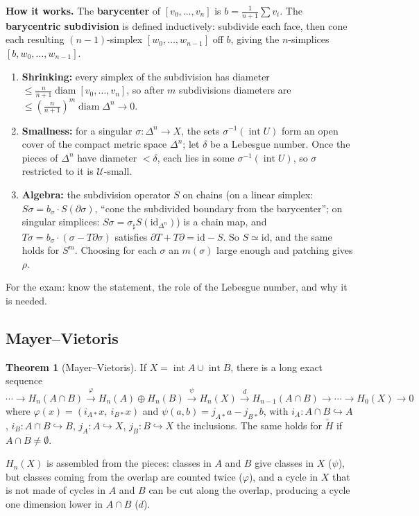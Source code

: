\documentclass[11pt]{article}
\newcommand{\Hred}{\tilde H}
\newcommand{\fig}[2]{\begin{center}\resizebox{#2}{!}{}\end{center}}
\theoremstyle{definition}
\newtheorem{thm}{Theorem}[section]
\begin{document}
\textbf{How it works.} The \textbf{barycenter} of $[v_0,\dots,v_n]$ is $b=\frac1{n+1}\sum v_i$. The \textbf{barycentric subdivision} is defined inductively: subdivide each face, then cone each resulting $(n-1)$-simplex $[w_0,\dots,w_{n-1}]$ off $b$, giving the $n$-simplices $[b,w_0,\dots,w_{n-1}]$.
\fig{barycentric}{0.28\textwidth}
\begin{enumerate}
\item \textbf{Shrinking:} every simplex of the subdivision has diameter $\le\frac{n}{n+1}\operatorname{diam}[v_0,\dots,v_n]$, so after $m$ subdivisions diameters are $\le(\frac n{n+1})^m\operatorname{diam}\Delta^n\to0$.
\item \textbf{Smallness:} for a singular $\sigma:\Delta^n\to X$, the sets $\sigma^{-1}(\operatorname{int}U)$ form an open cover of the compact metric space $\Delta^n$; let $\delta$ be a Lebesgue number. Once the pieces of $\Delta^n$ have diameter $<\delta$, each lies in some $\sigma^{-1}(\operatorname{int}U)$, so $\sigma$ restricted to it is $\mathcal U$-small.
\item \textbf{Algebra:} the subdivision operator $S$ on chains (on a linear simplex: $S\sigma=b_\sigma\cdot S(\partial\sigma)$, ``cone the subdivided boundary from the barycenter''; on singular simplices: $S\sigma=\sigma_\sharp S(\mathrm{id}_{\Delta^n})$) is a chain map, and $T\sigma=b_\sigma\cdot(\sigma-T\partial\sigma)$ satisfies $\partial T+T\partial=\mathrm{id}-S$. So $S\simeq\mathrm{id}$, and the same holds for $S^m$. Choosing for each $\sigma$ an $m(\sigma)$ large enough and patching gives $\rho$.
\end{enumerate}
For the exam: know the statement, the role of the Lebesgue number, and why it is needed.

\subsection{Mayer--Vietoris}
\begin{thm}[Mayer--Vietoris]
If $X=\operatorname{int}A\cup\operatorname{int}B$, there is a long exact sequence
\[\cdots\to H_n(A\cap B)\xrightarrow{\varphi}H_n(A)\oplus H_n(B)\xrightarrow{\psi}H_n(X)\xrightarrow{d}H_{n-1}(A\cap B)\to\cdots\to H_0(X)\to0\]
where $\varphi(x)=(i_{A*}x,\ i_{B*}x)$ and $\psi(a,b)=j_{A*}a-j_{B*}b$, with $i_A:A\cap B\hookrightarrow A$, $i_B:A\cap B\hookrightarrow B$, $j_A:A\hookrightarrow X$, $j_B:B\hookrightarrow X$ the inclusions. The same holds for $\Hred$ if $A\cap B\neq\emptyset$.
\end{thm}
\begin{intuition}
$H_n(X)$ is assembled from the pieces: classes in $A$ and $B$ give classes in $X$ ($\psi$), but classes coming from the overlap are counted twice ($\varphi$), and a cycle in $X$ that is not made of cycles in $A$ and $B$ can be cut along the overlap, producing a cycle one dimension lower in $A\cap B$ ($d$).
\end{intuition}
\end{document}
